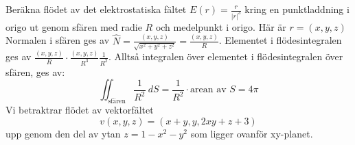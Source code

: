 \documentclass{report}
\begin{document}
\qs{}
{
Beräkna flödet av det elektrostatiska fältet $ E(r) = \frac{r}{|r|^3}  $ kring en punktladdning i origo ut genom sfären med radie $ R $ och medelpunkt i origo. Här är $ r = (x,y,z) $ 
}
\sol Normalen i sfären ges av $ \hat{N} = \frac{(x,y,z)}{ \sqrt{x^2+y^2+z^2}  }  = \frac{(x,y,z)}{R} $. Elementet i flödesintegralen ges av $ \frac{(x,y,z)}{R} \cdot \frac{(x,y,z)}{R^3}   \frac{1}{R^2}  $. Alltså integralen över elementet i flödesintegralen över sfären, ges av:
\begin{equation*}
\iint_{ \text{sfären}  }^{} \frac{1}{R^2}  \: dS = \frac{1}{R^2} \cdot \text{arean av } S = 4\pi  
\end{equation*}
\pagebreak
{}
{
Vi betraktrar flödet av vektorfältet
\begin{equation*}
v(x,y,z) = (x+y, y, 2xy+z+3)
\end{equation*}
upp genom den del av ytan $ z = 1-x^2-y^2 $ som ligger ovanför xy-planet.\\\\

}
\end{document}
